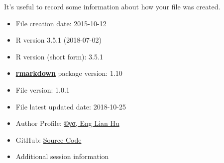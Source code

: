 \documentclass[]{article}
\providecommand{\tightlist}{%
  \setlength{\itemsep}{0pt}\setlength{\parskip}{0pt}}
\begin{document}
It's useful to record some information about how your file was created.

\begin{itemize}
\tightlist
\item
  File creation date: 2015-10-12
\item
  R version 3.5.1 (2018-07-02)
\item
  R version (short form): 3.5.1
\item
  \href{https://github.com/rstudio/rmarkdown}{\textbf{rmarkdown}}
  package version: 1.10
\item
  File version: 1.0.1
\item
  File latest updated date: 2018-10-25
\item
  Author Profile:
  \href{https://beta.rstudioconnect.com/content/3091/ryo-eng.html}{®γσ,
  Eng Lian Hu}
\item
  GitHub: \href{https://github.com/scibrokes/owner}{Source Code}
\item
  Additional session information
\end{itemize}
\end{document}
